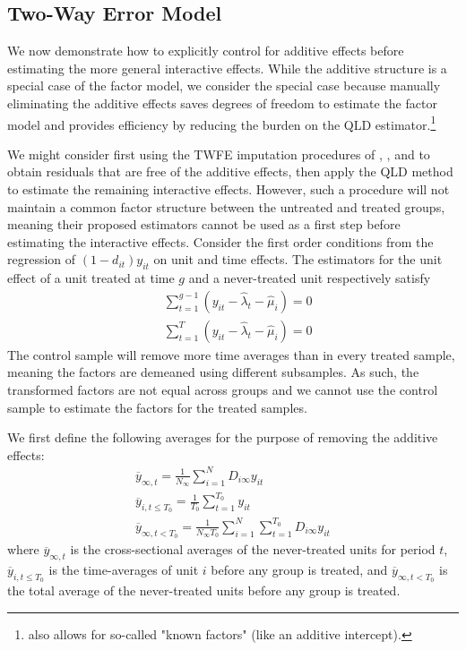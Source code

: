 \documentclass[12pt]{article}
\begin{document}
\subsection{Two-Way Error Model}

We now demonstrate how to explicitly control for additive effects before estimating the more general interactive effects. While the additive structure is a special case of the factor model, we consider the special case because manually eliminating the additive effects saves degrees of freedom to estimate the factor model and provides efficiency by reducing the burden on the QLD estimator.\footnote{\citet{pesaran2006estimation} also allows for so-called "known factors" (like an additive intercept).} 

We might consider first using the TWFE imputation procedures of \citet{Gardner_2021}, \cite{Wooldridge_2021}, and \citet{Borusyak_Jaravel_Spiess_2021} to obtain residuals that are free of the additive effects, then apply the QLD method to estimate the remaining interactive effects. However, such a procedure will not maintain a common factor structure between the untreated and treated groups, meaning their proposed estimators cannot be used as a first step before estimating the interactive effects. Consider the first order conditions from the regression of $(1 - d_{it})y_{it}$ on unit and time effects. The estimators for the unit effect of a unit treated at time $g$ and a never-treated unit respectively satisfy
\begin{align}
  &\sum_{t = 1}^{g-1} (y_{it} - \widehat{\lambda}_t - \widehat{\mu}_i) = 0\\
  &\sum_{t = 1}^T (y_{it} - \widehat{\lambda}_t - \widehat{\mu}_i) = 0
\end{align}
The control sample will remove more time averages than in every treated sample, meaning the factors are demeaned using different subsamples. As such, the transformed factors are not equal across groups and we cannot use the control sample to estimate the factors for the treated samples. 

We first define the following averages for the purpose of removing the additive effects:
\begin{gather}
  \overline{y}_{\infty , t} = \frac{1}{N_{\infty}} \sum_{i = 1}^N D_{i \infty} y_{it} \\
  \overline{y}_{i,t\leq T_0} = \frac{1}{T_0} \sum_{t = 1}^{T_0} y_{it} \\
  \overline{y}_{\infty, t < T_0} = \frac{1}{N_{\infty} T_0} \sum_{i = 1}^N \sum_{t = 1}^{T_0} D_{i \infty} y_{it}
\end{gather}
where $\overline{y}_{\infty , t}$ is the cross-sectional averages of the never-treated units for period $t$, $\overline{y}_{i,t\leq T_0}$ is the time-averages of unit $i$ before any group is treated, and $\overline{y}_{\infty, t < T_0}$ is the total average of the never-treated units before any group is treated.
\end{document}
